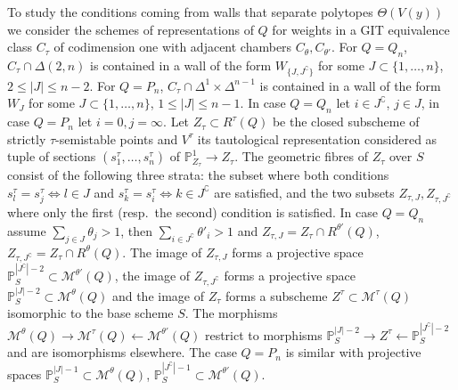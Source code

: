 \documentclass[10pt,a4paper]{amsart}
\theoremstyle{definition}
\def\P{\mathds P}
\begin{document}
To study the conditions coming from walls that separate polytopes $\Theta(V(y))$ 
we consider the schemes of representations of $Q$ for weights in a GIT equivalence
class $C_\tau$ of codimension one with adjacent chambers $C_\theta,C_{\theta'}$. 
For $Q=Q_n$, $C_\tau\cap\Delta(2,n)$ is contained in a wall of the form 
$W_{\{J,J^\complement\}}$ for some $J\subset\{1,\ldots,n\}$, $2\leq|J|\leq n-2$. 
For $Q=P_n$, $C_\tau\cap\Delta^1\times\Delta^{n-1}$ is contained in a 
wall of the form $W_J$ for some $J\subset\{1,\ldots,n\}$, $1\leq|J|\leq n-1$. 
In case $Q=Q_n$ let $i\in J^\complement$, $j\in J$, in case $Q=P_n$ let $i=0,j=\infty$.
Let $Z_\tau\subset R^\tau(Q)$ be the closed subscheme of strictly 
$\tau$-semistable points and $V^\tau$ its tautological representation
considered as tuple of sections $(s^\tau_1,\ldots,s^\tau_n)$ of $\P^1_{Z_\tau}\to Z_\tau$.
The geometric fibres of $Z_\tau$ over $S$ consist of the following three strata: 
the subset where both conditions $s^\tau_l=s^\tau_j\Leftrightarrow l\in J$ and 
$s^\tau_k=s^\tau_i\Leftrightarrow k\in J^\complement$ 
are satisfied, and the two subsets $Z_{\tau,J},Z_{\tau,J^\complement}$ where only 
the first (resp.\ the second) condition is satisfied. 
In case $Q=Q_n$ assume $\sum_{j\in J}\theta_j>1$, then 
$\sum_{i\in J^\complement}\theta'_i>1$ and $Z_{\tau,J}=Z_{\tau}\cap R^{\theta'}(Q)$, 
$Z_{\tau,J^\complement}=Z_{\tau}\cap R^\theta(Q)$.
The image of $Z_{\tau,J}$ forms a projective space 
$\P^{|J^\complement|-2}_S\subset\mathcal M^{\theta'}(Q)$, the image of 
$Z_{\tau,J^\complement}$ forms a projective space 
$\P^{|J|-2}_S\subset\mathcal M^\theta(Q)$ and the image of $Z_\tau$ forms 
a subscheme $Z^\tau\subset\mathcal M^\tau(Q)$ isomorphic to the base scheme $S$. 
The morphisms
$\mathcal M^\theta(Q)\rightarrow\mathcal M^\tau(Q)\leftarrow\mathcal M^{\theta'}(Q)$
restrict to morphisms $\P^{|J|-2}_S\rightarrow Z^\tau\leftarrow\P^{|J^\complement|-2}_S$
and are isomorphisms elsewhere.
The case $Q=P_n$ is similar with projective spaces
$\P^{|J|-1}_S\subset\mathcal M^\theta(Q)$, 
$\P^{|J^\complement|-1}_S\subset\mathcal M^{\theta'}(Q)$. 

\end{document}
